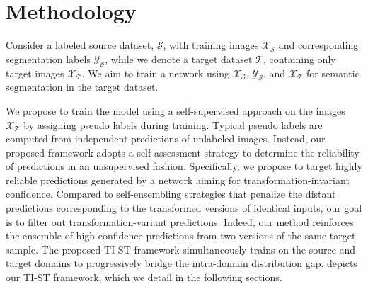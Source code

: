 \section{Methodology}
\label{sec:tist_methodology}

Consider a labeled source dataset, $\mathcal{S}$, with training images $\mathcal{X_S}$ and corresponding segmentation labels $\mathcal{Y_S}$, while we denote a target dataset $\mathcal{T}$, containing only target images $\mathcal{X_T}$. We aim to train a network using $\mathcal{X_S}$, $\mathcal{Y_S}$, and $\mathcal{X_T}$ for semantic segmentation in the target dataset. 

We propose to train the model using a self-supervised approach on the images $\mathcal{X_T}$ by assigning pseudo labels during training. Typical pseudo labels are computed from independent predictions of unlabeled images. Instead, our proposed framework adopts a self-assessment strategy to determine the reliability of predictions in an unsupervised fashion. Specifically, we propose to target highly reliable predictions generated by a network aiming for transformation-invariant confidence. Compared to self-ensembling strategies that penalize the distant predictions corresponding to the transformed versions of identical inputs, our goal is to filter out transformation-variant predictions. Indeed, our method reinforces the ensemble of high-confidence predictions from two versions of the same target sample. The proposed TI-ST framework simultaneously trains on the source and target domains to progressively bridge the intra-domain distribution gap.  depicts our TI-ST framework, which we detail in the following sections. 




